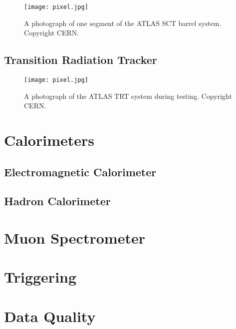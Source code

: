 
\begin{figure}
\centering
\texttt{[image: pixel.jpg]}
\label{fig:detector:atlas}
\caption{A photograph of one segment of the ATLAS SCT barrel system. Copyright CERN.}
\end{figure}


\subsection{Transition Radiation Tracker}


\begin{figure}
\centering
\texttt{[image: pixel.jpg]}
\label{fig:detector:atlas}
\caption{A photograph of the ATLAS TRT system during testing. Copyright CERN.}
\end{figure}


\section{Calorimeters}

\subsection{Electromagnetic Calorimeter}

\subsection{Hadron Calorimeter}

\section{Muon Spectrometer}

\section{Triggering}

\section{Data Quality}